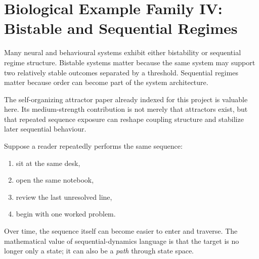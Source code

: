 \section{Biological Example Family IV: Bistable and Sequential Regimes}

Many neural and behavioural systems exhibit either bistability or sequential
regime structure. Bistable systems matter because the same system may support
two relatively stable outcomes separated by a threshold. Sequential regimes
matter because order can become part of the system architecture.

The self-organizing attractor paper already indexed for this project is
valuable here. Its medium-strength contribution is not merely that attractors
exist, but that repeated sequence exposure can reshape coupling structure and
stabilize later sequential behaviour.

\begin{example}
Suppose a reader repeatedly performs the same sequence:
\begin{enumerate}[nosep]
  \item sit at the same desk,
  \item open the same notebook,
  \item review the last unresolved line,
  \item begin with one worked problem.
\end{enumerate}
Over time, the sequence itself can become easier to enter and traverse. The
mathematical value of sequential-dynamics language is that the target is no
longer only a state; it can also be a \emph{path} through state space.
\end{example}
